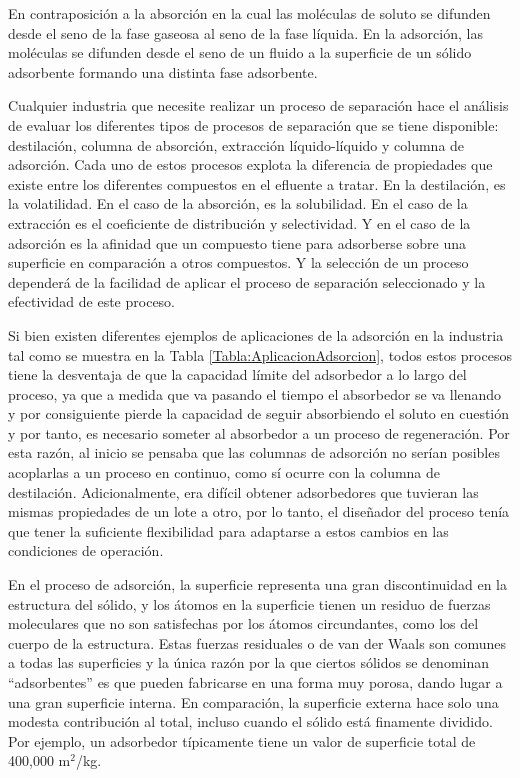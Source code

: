\documentclass[11pt]{book}
\begin{document}
En contraposición a la absorción en la cual las moléculas de soluto se difunden desde el seno de la fase gaseosa al seno de la fase líquida. En la adsorción, las moléculas se difunden desde el seno de un fluido a la superficie de un sólido adsorbente formando una distinta fase adsorbente.

Cualquier industria que necesite realizar un proceso de separación hace el análisis de evaluar los diferentes tipos de procesos de separación que se tiene disponible: destilación, columna de absorción, extracción líquido-líquido y columna de adsorción. Cada uno de estos procesos explota la diferencia de propiedades que existe entre los diferentes compuestos en el efluente a tratar. En la destilación, es la volatilidad. En el caso de la absorción, es la solubilidad. En el caso de la extracción es el coeficiente de distribución y selectividad. Y en el caso de la adsorción es la afinidad que un compuesto tiene para adsorberse sobre una superficie en comparación a otros compuestos. Y la selección de un proceso dependerá de la facilidad de aplicar el proceso de separación seleccionado y la efectividad de este proceso. 

Si bien existen diferentes ejemplos de aplicaciones de la adsorción en la industria tal como se muestra en la Tabla \ref{Tabla:AplicacionAdsorcion}, todos estos procesos tiene la desventaja de que la capacidad límite del adsorbedor a lo largo del proceso, ya que a medida que va pasando el tiempo el absorbedor se va llenando y por consiguiente pierde la capacidad de seguir absorbiendo el soluto en cuestión y por tanto, es necesario someter al absorbedor a un proceso de regeneración. Por esta razón, al inicio se pensaba que las columnas de adsorción no serían posibles acoplarlas a un proceso en continuo, como sí ocurre con la columna de destilación. Adicionalmente, era difícil obtener adsorbedores que tuvieran las mismas propiedades de un lote a otro, por lo tanto, el diseñador del proceso tenía que tener la suficiente flexibilidad para adaptarse a estos cambios en las condiciones de operación.

En el proceso de adsorción, la superficie representa una gran discontinuidad en la estructura del sólido, y los átomos en la superficie tienen un residuo de fuerzas moleculares que no son satisfechas por los átomos circundantes, como los del cuerpo de la estructura. Estas fuerzas residuales o de van der Waals son comunes a todas las superficies y la única razón por la que ciertos sólidos se denominan “adsorbentes” es que pueden fabricarse en una forma muy porosa, dando lugar a una gran superficie interna. En comparación, la superficie externa hace solo una modesta contribución al total, incluso cuando el sólido está finamente dividido. Por ejemplo, un adsorbedor típicamente tiene un valor de superficie total de 400,000 m$^2$/kg.
\end{document}
